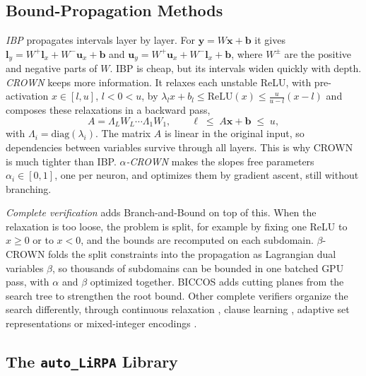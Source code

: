 \documentclass[runningheads]{llncs}
\begin{document}
\subsection{Bound-Propagation Methods}

\emph{IBP} \cite{Gowal2018IBP} propagates intervals layer by layer. For
$\mathbf{y} = W\mathbf{x} + \mathbf{b}$ it gives
$\mathbf{l}_y = W^+\mathbf{l}_x + W^-\mathbf{u}_x + \mathbf{b}$ and
$\mathbf{u}_y = W^+\mathbf{u}_x + W^-\mathbf{l}_x + \mathbf{b}$, where $W^\pm$
are the positive and negative parts of $W$. IBP is cheap, but its intervals
widen quickly with depth. \emph{CROWN} \cite{CROWNPaper} keeps more
information. It relaxes each unstable ReLU, with pre-activation $x \in [l,u]$,
$l<0<u$, by $\lambda_l x + b_l \leq \mathrm{ReLU}(x) \leq \frac{u}{u-l}(x-l)$
and composes these relaxations in a backward pass,
\begin{equation}
  A = \Lambda_L W_L \cdots \Lambda_1 W_1,\qquad
  \ell \;\leq\; A\mathbf{x} + \mathbf{b} \;\leq\; u,
  \label{eq:crown}
\end{equation}
with $\Lambda_i = \mathrm{diag}(\lambda_i)$. The matrix $A$ is linear in the
original input, so dependencies between variables survive through all layers.
This is why CROWN is much tighter than IBP. \emph{$\alpha$-CROWN}
\cite{Xu2021FastComplete} makes the slopes free parameters
$\alpha_i \in [0,1]$, one per neuron, and optimizes them by gradient ascent,
still without branching.

\emph{Complete verification} \cite{betaCROWN2021} adds Branch-and-Bound on top
of this. When the relaxation is too loose, the problem is split, for example by
fixing one ReLU to $x \geq 0$ or to $x < 0$, and the bounds are recomputed on
each subdomain. $\beta$-CROWN folds the split constraints into the propagation
as Lagrangian dual variables $\beta$, so thousands of subdomains can be bounded
in one batched GPU pass, with $\alpha$ and $\beta$ optimized together. BICCOS
\cite{NeurIPS2024BnbCuttingPlanes} adds cutting planes from the search tree to
strengthen the root bound. Other complete verifiers organize the search
differently, through continuous relaxation \cite{arXiv2401Marabou2}, clause
learning \cite{NeuralSATRepo}, adaptive set representations \cite{NNEnumPaper}
or mixed-integer encodings \cite{arXiv1711MIPRobustness}.

\subsection{The \texttt{auto\_LiRPA} Library}
\end{document}
